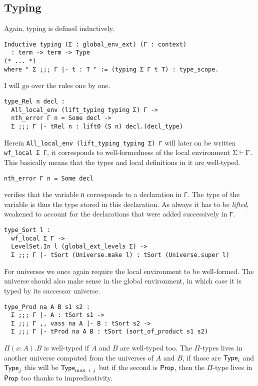 \subsection{Typing}

Again, typing is defined inductively.
\begin{verbatim}
Inductive typing (Σ : global_env_ext) (Γ : context)
  : term -> term -> Type
(* ... *)
where " Σ ;;; Γ |- t : T " := (typing Σ Γ t T) : type_scope.
\end{verbatim}
I will go over the rules one by one.

\begin{verbatim}
type_Rel n decl :
  All_local_env (lift_typing typing Σ) Γ ->
  nth_error Γ n = Some decl ->
  Σ ;;; Γ |- tRel n : lift0 (S n) decl.(decl_type)
\end{verbatim}
Herein \texttt{All_local_env (lift_typing typing Σ) Γ} will later on
be written \texttt{wf_local Σ Γ}, it corresponds to well-formedness
of the local environment \(\Sigma \vdash \Gamma\). This basically means that
the types and local definitions in it are well-typed.
\begin{verbatim}
nth_error Γ n = Some decl
\end{verbatim}
verifies that the variable
\texttt{n} corresponds to a declaration in \texttt{Γ}.
The type of the variable is thus the type stored in this declaration. As always
it has to be \emph{lifted}, \ie weakened to account for the declarations
that were added successively in \texttt{Γ}.

\begin{verbatim}
type_Sort l :
  wf_local Σ Γ ->
  LevelSet.In l (global_ext_levels Σ) ->
  Σ ;;; Γ |- tSort (Universe.make l) : tSort (Universe.super l)
\end{verbatim}
For universes we once again require the local environment to be well-formed.
The universe should also make sense in the global environment, in which case it
is typed by its successor universe.

\begin{verbatim}
type_Prod na A B s1 s2 :
  Σ ;;; Γ |- A : tSort s1 ->
  Σ ;;; Γ ,, vass na A |- B : tSort s2 ->
  Σ ;;; Γ |- tProd na A B : tSort (sort_of_product s1 s2)
\end{verbatim}
\(\Pi (x:A).B\) is well-typed if \(A\) and \(B\) are well-typed too.
The \(\Pi\)-types lives in another universe computed from the universes of
\(A\) and \(B\), if those are \(\mathsf{Type}_i\) and \(\mathsf{Type}_j\) this will be
\(\mathsf{Type}_{\max\ i\ j}\) but if the second is \(\mathsf{Prop}\), then the \(\Pi\)-type
lives in \(\mathsf{Prop}\) too thanks to impredicativity.

